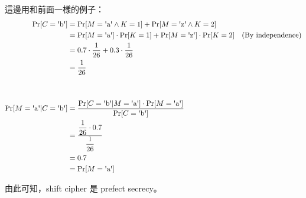 這邊用和前面一樣的例子：
\begin{align*}
	\Pr[C = \letter{b}] &= 
			\Pr[M = \letter{a} \wedge K = 1] +
			\Pr[M = \letter{z} \wedge K = 2] \\
		&= \Pr[M = \letter{a}] \cdot \Pr[K = 1] + 
			\Pr[M = \letter{z}] \cdot \Pr[K = 2]
			\quad \text{(By independence)} \\
		&= 0.7 \cdot \frac{1}{26} + 0.3 \cdot \frac{1}{26} \\
		&= \frac{1}{26} \\
	& \\
	& \\
	\Pr[M = \letter{a} | C =  \letter{b}] &=
	\frac{\Pr[C = \letter{b} | M = \letter{a}] \cdot \Pr[M = \letter{a}]}{\Pr[C = \letter{b}]} \\
	&= \frac{\displaystyle{\frac{1}{26}} \cdot 0.7}{\displaystyle{\frac{1}{26}}} \\
	&= 0.7 \\
	&= \Pr[M = \letter{a}]
\end{align*}

由此可知，shift cipher 是 prefect secrecy。

